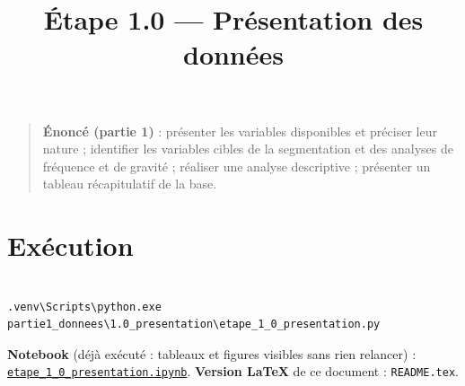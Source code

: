 \documentclass[

  french,

  10pt,

  a4paper,

]{article}
\title{Étape 1.0 --- Présentation des données}
\author{}
\date{}
\begin{document}
\maketitle



{

\hypersetup{linkcolor=black}

\setcounter{tocdepth}{3}

\tableofcontents

}

\begin{quote}

\textbf{Énoncé (partie 1)} : présenter les variables disponibles et préciser leur nature ; identifier les variables cibles de la segmentation et des analyses de fréquence et de gravité ; réaliser une analyse descriptive ; présenter un tableau récapitulatif de la base.

\end{quote}



\section{Exécution}



\begin{verbatim}

.venv\Scripts\python.exe partie1_donnees\1.0_presentation\etape_1_0_presentation.py

\end{verbatim}



\textbf{Notebook} (déjà exécuté : tableaux et figures visibles sans rien relancer) : \href{etape_1_0_presentation.ipynb}{\texttt{etape\_1\_0\_presentation.ipynb}}. \textbf{Version LaTeX} de ce document : \texttt{README.tex}.
\end{document}
